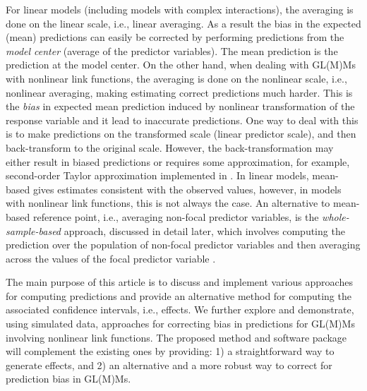 For linear models (including models with complex interactions), the averaging is done on the linear scale, i.e., linear averaging. As a result the bias in the expected (mean) predictions can easily be corrected by performing predictions from the \emph{model center} (average of the predictor variables). The mean prediction is the prediction at the model center. On the other hand, when dealing with GL(M)Ms with nonlinear link functions, the averaging is done on the nonlinear scale, i.e., nonlinear averaging, making estimating correct predictions much harder. This is the \emph{bias} in expected mean prediction induced by nonlinear transformation of the response variable and it lead to inaccurate predictions. One way to deal with this is to make predictions on the transformed scale (linear predictor scale), and then back-transform to the original scale. However, the back-transformation may either result in biased predictions or requires some approximation, for example, second-order Taylor approximation implemented in  \citep{lenth2018package}. In linear models, mean-based gives estimates consistent with the observed values, however, in models with nonlinear link functions, this is not always the case. An alternative to mean-based reference point, i.e., averaging non-focal predictor variables, is the \emph{whole-sample-based} approach, discussed in detail later, which involves computing the prediction over the population of non-focal predictor variables and then averaging across the values of the focal predictor variable \citep{hanmer2013behind}. 


The main purpose of this article is to discuss and implement various approaches for computing predictions and provide an alternative method for computing the associated confidence intervals, i.e., effects. We further explore and demonstrate, using simulated data, approaches for correcting bias in predictions for GL(M)Ms involving nonlinear link functions. The proposed method and  software package will complement the existing ones by providing: 1) a straightforward way to generate effects, and 2) an alternative and a more robust way to correct for prediction bias in GL(M)Ms.


